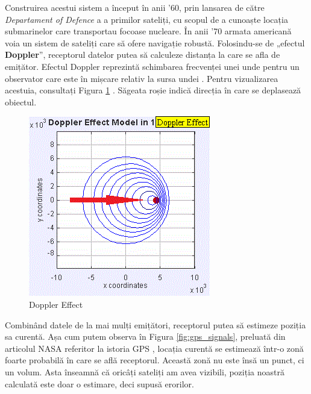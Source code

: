 \documentclass[12pt,a4paper]{article}
\begin{document}
Construirea acestui sistem a început în anii '60, prin lansarea de către \textit{Departament of Defence} a a primilor sateliți, cu scopul de a cunoaște locația submarinelor care transportau focoase nucleare. În anii '70
armata americană voia un sistem de sateliți care să ofere navigație robustă. Folosindu-se de „efectul \textbf{Doppler}”, receptorul datelor putea să calculeze distanța la care se afla de emițător. Efectul Doppler reprezintă schimbarea frecvenței unei unde pentru un observator care este în mișcare relativ la sursa undei \cite{DopplerEffectWikipedia}. Pentru vizualizarea acestuia, consultați Figura \ref{fig:doppler_effect_moving_object} \cite{DopplerEffectWikipedia}. Săgeata roșie indică direcția în care se deplasează obiectul.

\begin{figure}[h]
\centering
\includegraphics[scale=1]{figures/doppler_effect_moving_object.png}
\caption{Doppler Effect}
\label{fig:doppler_effect_moving_object}
\end{figure}

Combinând datele de la mai mulți emițători, receptorul putea să estimeze poziția sa curentă. Așa cum putem observa în Figura \ref{fig:gps_signals}, preluată din articolul NASA referitor la istoria GPS \cite{GPSHistoryNASA}, locația curentă se estimează într-o zonă foarte probabilă în care se află receptorul. Această zonă nu este însă un punct, ci un volum. Asta înseamnă că oricâți sateliți am avea vizibili, poziția noastră calculată este doar o estimare, deci supusă erorilor.
\end{document}

